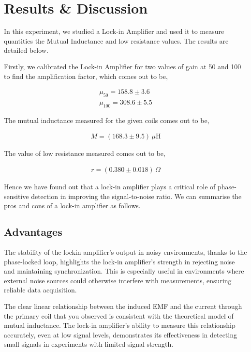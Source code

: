 \section{Results \& Discussion}
In this experiment, we studied a Lock-in Amplifier and used it to measure quantities the Mutual Inductance and low resistance values. The results are detailed below.

Firstly, we calibrated the Lock-in Amplifier for two values of gain at 50 and 100 to find the amplification factor, which comes out to be,

\begin{align*}
    \mu_{50} = 158.8 \pm 3.6\\
    \mu_{100} = 308.6 \pm 5.5
\end{align*}

The mutual inductance measured for the given coils comes out to be,

\begin{align*}
    M = (168.3 \pm 9.5)\,\mu\text{H}
\end{align*}

The value of low resistance measured comes out to be,

\begin{align*}
    r = (0.380 \pm 0.018)\,\Omega
\end{align*}


Hence we have found out that a lock-in amplifier plays a critical
role of phase-sensitive detection in improving
the signal-to-noise ratio. We can summarise the pros and cons of a lock-in amplifier as follows.

\subsection*{Advantages}
The stability of the lockin amplifier’s output in noisy environments,
thanks to the phase-locked loop, highlights the
lock-in amplifier’s strength in rejecting noise
and maintaining synchronization.
This is especially useful in environments where external noise sources could otherwise interfere with measurements, ensuring reliable data acquisition.

The clear linear relationship between the induced EMF and the current through the primary coil that you observed
is consistent with the theoretical model of mutual inductance. The lock-in amplifier’s ability
to measure this relationship accurately, even at
low signal levels, demonstrates its effectiveness
in detecting small signals in experiments with
limited signal strength.

